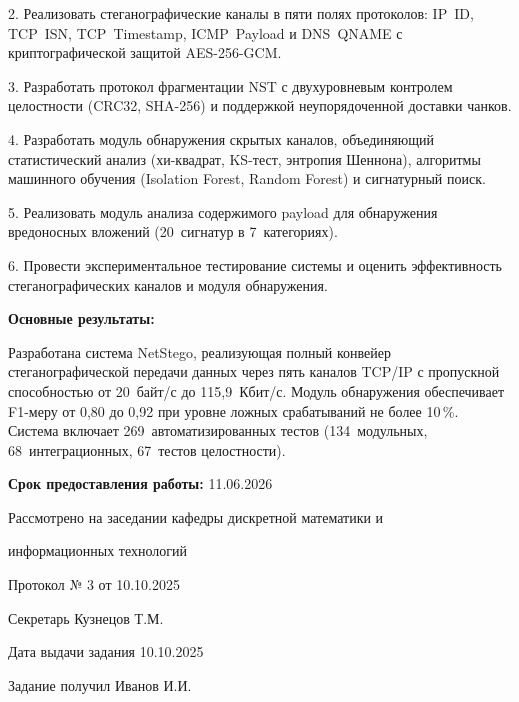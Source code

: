 \documentclass[bachelor, och, assignment]{SCWorks}
\begin{document}
2. Реализовать стеганографические каналы в пяти полях протоколов: IP~ID, TCP~ISN, TCP~Timestamp, ICMP~Payload и DNS~QNAME с криптографической защитой AES-256-GCM.

3. Разработать протокол фрагментации NST с двухуровневым контролем целостности (CRC32, SHA-256) и поддержкой неупорядоченной доставки чанков.

4. Разработать модуль обнаружения скрытых каналов, объединяющий статистический анализ (хи-квадрат, KS-тест, энтропия Шеннона), алгоритмы машинного обучения (Isolation Forest, Random Forest) и сигнатурный поиск.

5. Реализовать модуль анализа содержимого payload для обнаружения вредоносных вложений (20~сигнатур в 7~категориях).

6. Провести экспериментальное тестирование системы и оценить эффективность стеганографических каналов и модуля обнаружения.

\textbf{Основные результаты:}

Разработана система NetStego, реализующая полный конвейер стеганографической передачи данных через пять каналов TCP/IP с пропускной способностью от 20~байт/с до 115{,}9~Кбит/с. Модуль обнаружения обеспечивает F1-меру от 0{,}80 до 0{,}92 при уровне ложных срабатываний не более 10\,\%. Система включает 269~автоматизированных тестов (134~модульных, 68~интеграционных, 67~тестов целостности).
\vspace{\baselineskip}


{\bf Срок предоставления работы:} 11.06.2026
\vspace{\baselineskip}

Рассмотрено на заседании кафедры дискретной математики и

информационных технологий
\vspace{\baselineskip}

Протокол № 3 от 10.10.2025
\vspace{\baselineskip}

Секретарь  \quad  \underline{\hspace{4cm}}   \quad Кузнецов Т.М.
\vspace{\baselineskip}

Дата выдачи задания 10.10.2025
\vspace{\baselineskip}

Задание получил \quad  \underline{\hspace{4cm}}   \quad Иванов И.И.
\end{document}
